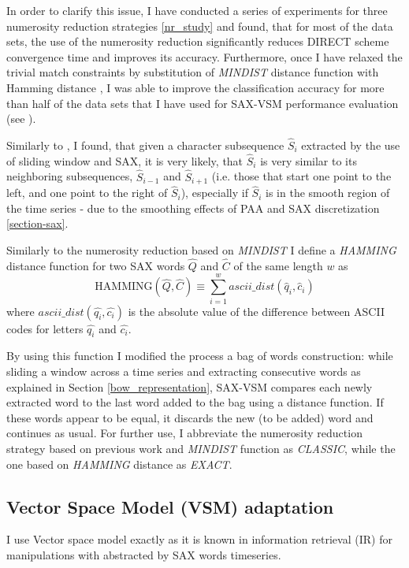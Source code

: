 In order to clarify this issue, I have conducted a series of experiments for three numerosity reduction strategies 
\ref{nr_study} and found, that for most of the data sets, the use of the numerosity reduction significantly reduces 
DIRECT scheme convergence time and improves its accuracy. 
Furthermore, once I have relaxed the trivial match constraints by substitution of \textit{MINDIST} distance function 
with Hamming distance \cite{hamming}, I was able to improve the classification accuracy for more than half of the data 
sets that I have used for SAX-VSM performance evaluation (see \cite{jmotif}). 

Similarly to \cite{citeulike:2821475}, I found, that given a character subsequence $\widehat{S}_{i}$ extracted by 
the use of sliding window and SAX, it is very likely, that $\widehat{S}_{i}$ is very similar to its
neighboring subsequences, $\widehat{S}_{i-1}$ and $\widehat{S}_{i+1}$ (i.e. those that start one 
point to the left, and one point to the right of $\widehat{S}_{i}$), especially if $\widehat{S}_{i}$
is in the smooth region of the time series - due to the smoothing effects of PAA and SAX discretization \ref{section-sax}. 

Similarly to the numerosity reduction based on \textit{MINDIST} I define a \textit{HAMMING} distance function for 
two SAX words $\hat{Q}$ and $\hat{C}$ of the same length $w$ as
\begin{equation}
\text{HAMMING}(\widehat{Q},\widehat{C}) \equiv \sum_{i=1}^{w} ascii\_dist( \widehat{q}_{i}, \widehat{c}_{i} ) 
\label{eq:hamming}
\end{equation} 
where $ascii\_dist( \widehat{q_{i}}, \widehat{c_{i}} )$ is the absolute value of the difference between ASCII 
codes for letters $\widehat{q_{i}}$ and $\widehat{c_{i}}$.

By using this function I modified the process a bag of words construction: while sliding a window 
across a time series and extracting consecutive words as explained in Section \ref{bow_representation}, 
SAX-VSM compares each newly extracted word to the last word added to the bag using a distance function. 
If these words appear to be equal, it discards the new (to be added) word and continues as usual. 
For further use, I abbreviate the numerosity reduction strategy based on previous work and \textit{MINDIST} 
function as \textit{CLASSIC}, while the one based on \textit{HAMMING} distance as \textit{EXACT}.

\subsection{Vector Space Model (VSM) adaptation}\label{vsm}
I use Vector space model exactly as it is known in information retrieval (IR) \cite{citeulike:300428} for 
manipulations with abstracted by SAX words timeseries. 

